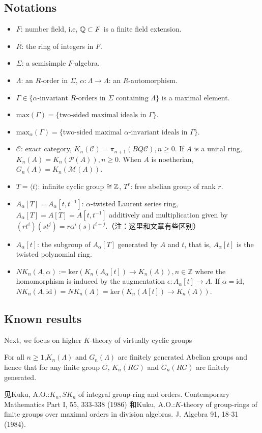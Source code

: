 \subsection{Notations}
\begin{itemize}
 	\item $F$: number field, i.e, $\mathbb{Q}\subset F$ is a finite field extension.
 	\item $R$: the ring of integers in $F$.
 	\item $\Sigma$: a semisimple $F$-algebra.
 	\item $\Lambda$: an $R$-order in $\Sigma$, $\alpha: \Lambda \rightarrow \Lambda$: an $R$-automorphism.
 	\item $\Gamma \in \{ \alpha\text{-invariant } R\text{-orders in } \Sigma \text{ containing } \Lambda\}$ is a maximal element.
 	\item $\mathrm{max}(\Gamma)=\{\text{two-sided maximal ideals in } \Gamma\}$.
 	\item $\mathrm{max}_{\alpha}(\Gamma)=\{\text{two-sided maximal $\alpha$-invariant ideals in } \Gamma\}$.
 	\item $\mathcal{C}$: exact category, $K_n(\mathcal{C})=\pi_{n+1}(BQ\mathcal{C}), n\geq 0$. If $A$ is a unital ring, $K_n(A)=K_n(\mathcal{P}(A)), n\geq 0$. When $A$ is noetherian, $G_n(A)=K_n(\mathcal{M}(A))$.
 	\item $T=\langle t\rangle$: infinite cyclic group $\cong \mathbb{Z}$, $T^r$: free abelian group of rank $r$.
 	\item $A_{\alpha}[T]=A_{\alpha}[t,t^{-1}]$: $\alpha$-twisted Laurent series ring, $A_{\alpha}[T]=A[T]=A[t,t^{-1}]$ additively and multiplication given by $(rt^i)(st^j)=r\alpha^i(s)t^{i+j}$.（注：这里和文章有些区别）
 	\item $A_{\alpha}[t]$: the subgroup of $A_{\alpha}[T]$ generated by $A$ and $t$, that is, $A_{\alpha}[t]$ is the twisted polynomial ring.
 	\item $NK_n(A,\alpha):=\mathrm{ker} (K_n(A_{\alpha} [t])\to K_n(A)),n\in \mathbb{Z}$ where the homomorphism is induced by the augmentation $\epsilon : A_{\alpha} [t]\to A$. If $\alpha = \mathrm{id}$, $NK_n(A,\mbox{id})=NK_n(A)=\mathrm{ker} (K_n(A[t])\to K_n(A))$.
 \end{itemize}

\subsection{Known results}
Next, we focus on higher $K$-theory of virtually cyclic groups
\begin{theorem}[A. Kuku]
For all $n \geq 1$,$ K_n(\Lambda)$ and $G_n(\Lambda)$ are finitely generated Abelian groups and hence that for any finite group $G$, $K_n(RG)$ and $G_n
(RG)$ are finitely generated. 
\end{theorem}
见Kuku, A.O.:$K_n, SK_n$ of integral group-ring and orders. Contemporary Mathematics Part
I, 55, 333-338 (1986)
和Kuku, A.O.:$K$-theory of group-rings of finite groups over maximal orders in division algebras. J. Algebra 91, 18-31 (1984).

